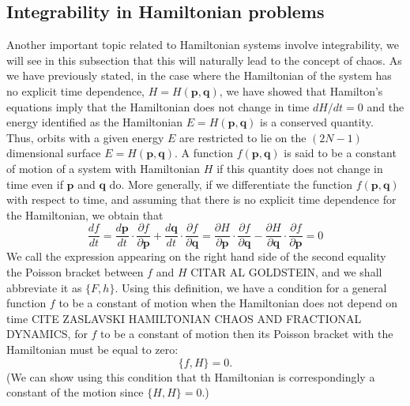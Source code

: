\subsection{Integrability in Hamiltonian problems}
Another important topic related to Hamiltonian systems involve integrability, we will see in this subsection that this will naturally lead to the concept of chaos. As we have previously stated, in the case where the Hamiltonian of the system has no explicit time dependence, $H=H(\bm{p},\bm{q})$, we have showed that Hamilton's equations imply that the Hamiltonian does not change in time $dH/dt=0$ and the energy identified as the Hamiltonian $E=H(\bm{p},\bm{q})$ is a conserved quantity. Thus, orbits with a given energy $E$ are restricted to lie on the $(2N-1)$ dimensional surface $E=H(\bm{p},\bm{q})$. A function $f(\bm{p},\bm{q})$ is said to be a constant of motion of a system with Hamiltonian $H$ if this quantity does not change in time even if $\bm{p}$ and $\bm{q}$ do. More generally, if we differentiate the function $f(\bm{p},\bm{q})$ with respect to time, and assuming that there is no explicit time dependence for the Hamiltonian, we obtain that
\begin{equation}
\frac{df}{dt}=\frac{d\bm{p}}{dt}\cdot\frac{\partial f}{\partial \bm{p}}+\frac{d\bm{q}}{dt}\cdot\frac{\partial f}{\partial \bm{q}}= \frac{\partial H}{\partial \bm{p}}\cdot\frac{\partial f}{\partial \bm{q}}-\frac{\partial H}{\partial \bm{q}}\cdot\frac{\partial f}{\partial \bm{p}}=0
\end{equation}
We call the expression appearing on the right hand side of the second equality the Poisson bracket between  $f$ and $H$ CITAR AL GOLDSTEIN, and we shall abbreviate it as $\{F,h\}$. Using this definition, we have a condition for a general function $f$ to be a constant of motion when the Hamiltonian does not depend on time CITE ZASLAVSKI HAMILTONIAN CHAOS AND FRACTIONAL DYNAMICS, for $f$ to be a constant of motion then its Poisson bracket with the Hamiltonian must be equal to zero:
\begin{equation}
\{ f,H\} =0.
\end{equation}
(We can show using this condition that th Hamiltonian is correspondingly a constant of the motion since $\{H,H\}=0$.)\par


